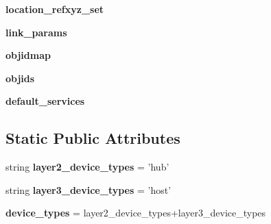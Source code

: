 \begin{DoxyCompactItemize}
\item 
\hypertarget{classcore_1_1misc_1_1xmlparser1_1_1_core_document_parser1_a65b08c764b9217d601d6ecad0cff9654}{{\bfseries location\+\_\+refxyz\+\_\+set}}\label{classcore_1_1misc_1_1xmlparser1_1_1_core_document_parser1_a65b08c764b9217d601d6ecad0cff9654}

\item 
\hypertarget{classcore_1_1misc_1_1xmlparser1_1_1_core_document_parser1_ad436f9b9e596230f53f940cc5c86c98f}{{\bfseries link\+\_\+params}}\label{classcore_1_1misc_1_1xmlparser1_1_1_core_document_parser1_ad436f9b9e596230f53f940cc5c86c98f}

\item 
\hypertarget{classcore_1_1misc_1_1xmlparser1_1_1_core_document_parser1_a9a4502fae87e834cd547386867793488}{{\bfseries objidmap}}\label{classcore_1_1misc_1_1xmlparser1_1_1_core_document_parser1_a9a4502fae87e834cd547386867793488}

\item 
\hypertarget{classcore_1_1misc_1_1xmlparser1_1_1_core_document_parser1_a4c7f3c4fc38c0b405691ade733df1934}{{\bfseries objids}}\label{classcore_1_1misc_1_1xmlparser1_1_1_core_document_parser1_a4c7f3c4fc38c0b405691ade733df1934}

\item 
\hypertarget{classcore_1_1misc_1_1xmlparser1_1_1_core_document_parser1_a5c9bc5f5357071541666d74cabd2a3ba}{{\bfseries default\+\_\+services}}\label{classcore_1_1misc_1_1xmlparser1_1_1_core_document_parser1_a5c9bc5f5357071541666d74cabd2a3ba}

\end{DoxyCompactItemize}
\subsection*{Static Public Attributes}
\begin{DoxyCompactItemize}
\item 
\hypertarget{classcore_1_1misc_1_1xmlparser1_1_1_core_document_parser1_ab59b31893b2a4931648687060081f55d}{string {\bfseries layer2\+\_\+device\+\_\+types} = 'hub'}\label{classcore_1_1misc_1_1xmlparser1_1_1_core_document_parser1_ab59b31893b2a4931648687060081f55d}

\item 
\hypertarget{classcore_1_1misc_1_1xmlparser1_1_1_core_document_parser1_a97f85cae38be4606790fd88c94f6b38f}{string {\bfseries layer3\+\_\+device\+\_\+types} = 'host'}\label{classcore_1_1misc_1_1xmlparser1_1_1_core_document_parser1_a97f85cae38be4606790fd88c94f6b38f}

\item 
\hypertarget{classcore_1_1misc_1_1xmlparser1_1_1_core_document_parser1_adf8229dd180a103db2830bea2f9ff750}{{\bfseries device\+\_\+types} = layer2\+\_\+device\+\_\+types+layer3\+\_\+device\+\_\+types}\label{classcore_1_1misc_1_1xmlparser1_1_1_core_document_parser1_adf8229dd180a103db2830bea2f9ff750}

\end{DoxyCompactItemize}


